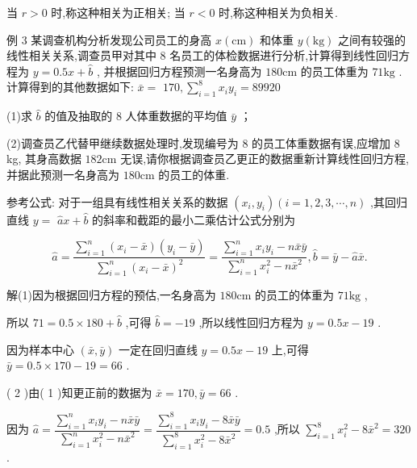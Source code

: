 当 $r > 0$ 时,称这种相关为正相关; 当 $r < 0$ 时,称这种相关为负相关.

例 3 某调查机构分析发现公司员工的身高 $x\left( \mathrm{{cm}}\right)$ 和体重 $y\left( \mathrm{{kg}}\right)$ 之间有较强的线性相关关系,调查员甲对其中 8 名员工的体检数据进行分析,计算得到线性回归方程为 $y = {0.5x} + \widehat{b}$ , 并根据回归方程预测一名身高为 ${180}\mathrm{{cm}}$ 的员工体重为 ${71}\mathrm{{kg}}$ . 计算得到的其他数据如下: $\bar{x} =$  ${170},\mathop{\sum }\limits_{{i = 1}}^{8}{x}_{i}{y}_{i} = {89920}$

(1)求 $\widehat{b}$ 的值及抽取的 8 人体重数据的平均值 $\bar{y}$ ；

(2)调查员乙代替甲继续数据处理时,发现编号为 8 的员工体重数据有误,应增加 8 kg, 其身高数据 ${182}\mathrm{{cm}}$ 无误,请你根据调查员乙更正的数据重新计算线性回归方程,并据此预测一名身高为 ${180}\mathrm{{cm}}$ 的员工的体重.

参考公式: 对于一组具有线性相关关系的数据 $\left( {{x}_{i},{y}_{i}}\right) \left( {i = 1,2,3,\cdots ,n}\right)$ ,其回归直线 $y =$  $\widehat{a}x + \widehat{b}$ 的斜率和截距的最小二乘估计公式分别为

\[
\widehat{a} = \dfrac{\mathop{\sum }\limits_{{i = 1}}^{n}\left( {{x}_{i} - \bar{x}}\right) \left( {{y}_{i} - \bar{y}}\right) }{\mathop{\sum }\limits_{{i = 1}}^{n}{\left( {x}_{i} - \bar{x}\right) }^{2}} = \dfrac{\mathop{\sum }\limits_{{i = 1}}^{n}{x}_{i}{y}_{i} - n\bar{x}\bar{y}}{\mathop{\sum }\limits_{{i = 1}}^{n}{x}_{i}^{2} - n{\bar{x}}^{2}},\widehat{b} = \bar{y} - \widehat{a}\bar{x}.
\]

解(1)因为根据回归方程的预估,一名身高为 ${180}\mathrm{{cm}}$ 的员工的体重为 ${71}\mathrm{{kg}}$ ,

所以 ${71} = {0.5} \times  {180} + \widehat{b}$ ,可得 $\widehat{b} =  - {19}$ ,所以线性回归方程为 $y = {0.5x} - {19}$ .

因为样本中心 $\left( {\bar{x},\bar{y}}\right)$ 一定在回归直线 $y = {0.5x} - {19}$ 上,可得 $\bar{y} = {0.5} \times  {170} - {19} = {66}$ .

( 2 )由( 1 )知更正前的数据为 $\bar{x} = {170},\bar{y} = {66}$ .

因为 $\widehat{a} = \dfrac{\mathop{\sum }\limits_{{i = 1}}^{n}{x}_{i}{y}_{i} - n\bar{x}\bar{y}}{\mathop{\sum }\limits_{{i = 1}}^{n}{x}_{i}^{2} - n{\bar{x}}^{2}} = \dfrac{\mathop{\sum }\limits_{{i = 1}}^{8}{x}_{i}{y}_{i} - 8\bar{x}\bar{y}}{\mathop{\sum }\limits_{{i = 1}}^{8}{x}_{i}^{2} - 8{\bar{x}}^{2}} = {0.5}$ ,所以 $\mathop{\sum }\limits_{{i = 1}}^{8}{x}_{i}^{2} - 8{\bar{x}}^{2} = {320}$ .

